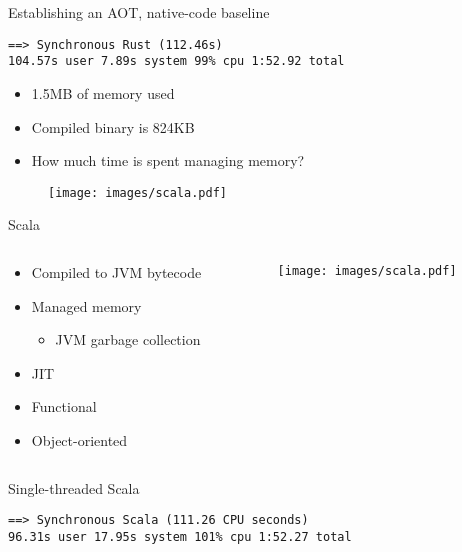 \documentclass[aspectratio=169]{beamer}
\begin{document}
\begin{frame}[fragile]{Establishing an AOT, native-code baseline}
  \begin{verbatim}
==> Synchronous Rust (112.46s)
104.57s user 7.89s system 99% cpu 1:52.92 total
    \end{verbatim}

    \begin{itemize}
      \item 1.5MB of memory used
      \item Compiled binary is 824KB
      \item How much time is spent managing memory?
    \end{itemize}
\end{frame}


\begin{frame}
  \begin{figure}
    \texttt{[image: images/scala.pdf]}
  \end{figure}
\end{frame}


\begin{frame}{Scala}
  \begin{columns}[c]
    \begin{column}{0.6\textwidth}
      \begin{itemize}
      \item Compiled to JVM bytecode
      \item Managed memory
        \begin{itemize}
          \item JVM garbage collection
        \end{itemize}
      \item JIT
      \item Functional
      \item Object-oriented
      \end{itemize}
    \end{column}

    \begin{column}{0.4\textwidth}
      \begin{figure}
        \texttt{[image: images/scala.pdf]}
      \end{figure}
    \end{column}
  \end{columns}
\end{frame}


\begin{frame}[fragile]{Single-threaded Scala}
  \begin{verbatim}
==> Synchronous Scala (111.26 CPU seconds)
96.31s user 17.95s system 101% cpu 1:52.27 total
  \end{verbatim}
\end{frame}
\end{document}
